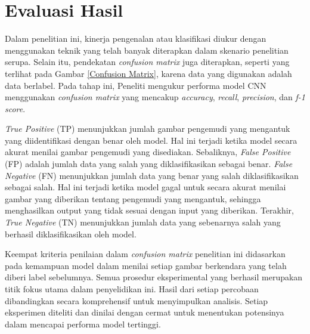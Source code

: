  

\section{Evaluasi Hasil}

    Dalam penelitian ini, kinerja pengenalan atau klasifikasi diukur dengan menggunakan teknik yang telah banyak diterapkan dalam skenario penelitian serupa. Selain itu, pendekatan \textit{confusion matrix} juga diterapkan, seperti yang terlihat pada Gambar \ref{Confusion Matrix}, karena data yang digunakan adalah data berlabel. Pada tahap ini, Peneliti mengukur performa model CNN menggunakan \textit{confusion matrix} yang mencakup \textit{accuracy}, \textit{recall},\textit{ precision}, dan \textit{f-1 score}.

    \textit{True Positive} (TP) menunjukkan jumlah gambar pengemudi yang mengantuk yang diidentifikasi dengan benar oleh model. Hal ini terjadi ketika model secara akurat menilai gambar pengemudi yang disediakan. Sebaliknya, \textit{False Positive} (FP) adalah jumlah data yang salah yang diklasifikasikan sebagai benar. \textit{False Negative} (FN) menunjukkan jumlah data yang benar yang salah diklasifikasikan sebagai salah. Hal ini terjadi ketika model gagal untuk secara akurat menilai gambar yang diberikan tentang pengemudi yang mengantuk, sehingga menghasilkan output yang tidak sesuai dengan input yang diberikan. Terakhir, \textit{True Negative} (TN) menunjukkan jumlah data yang sebenarnya salah yang berhasil diklasifikasikan oleh model.
    
    Keempat kriteria penilaian dalam \textit{confusion matrix }penelitian ini didasarkan pada kemampuan model dalam menilai setiap gambar berkendara yang telah diberi label sebelumnya. Semua prosedur eksperimental yang berhasil merupakan titik fokus utama dalam penyelidikan ini. Hasil dari setiap percobaan dibandingkan secara komprehensif untuk menyimpulkan analisis. Setiap eksperimen diteliti dan dinilai dengan cermat untuk menentukan potensinya dalam mencapai performa model tertinggi.


